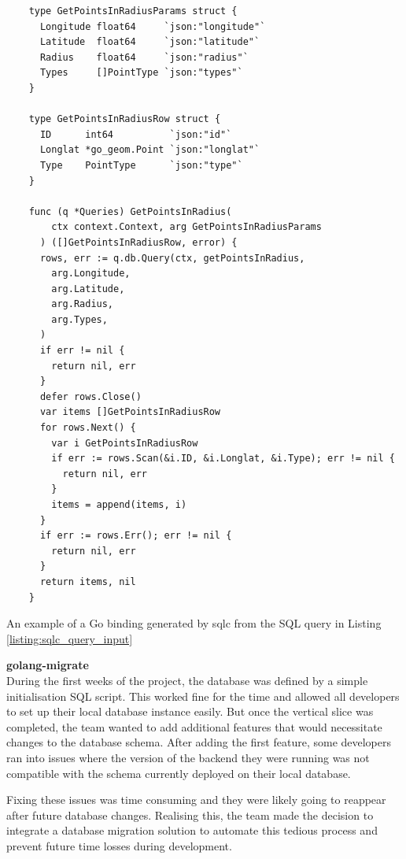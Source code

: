 \begin{listing}[htbp]
  \centering{}
  \begin{minipage}{0.85\textwidth}
  \begin{verbatim}
    type GetPointsInRadiusParams struct {
      Longitude float64     `json:"longitude"`
      Latitude  float64     `json:"latitude"`
      Radius    float64     `json:"radius"`
      Types     []PointType `json:"types"`
    }

    type GetPointsInRadiusRow struct {
      ID      int64          `json:"id"`
      Longlat *go_geom.Point `json:"longlat"`
      Type    PointType      `json:"type"`
    }

    func (q *Queries) GetPointsInRadius(
        ctx context.Context, arg GetPointsInRadiusParams
      ) ([]GetPointsInRadiusRow, error) {
      rows, err := q.db.Query(ctx, getPointsInRadius,
        arg.Longitude,
        arg.Latitude,
        arg.Radius,
        arg.Types,
      )
      if err != nil {
        return nil, err
      }
      defer rows.Close()
      var items []GetPointsInRadiusRow
      for rows.Next() {
        var i GetPointsInRadiusRow
        if err := rows.Scan(&i.ID, &i.Longlat, &i.Type); err != nil {
          return nil, err
        }
        items = append(items, i)
      }
      if err := rows.Err(); err != nil {
        return nil, err
      }
      return items, nil
    }
  \end{verbatim}
  \end{minipage}
  \caption{An example of a Go binding generated by sqlc from the SQL query in
  Listing \ref{listing:sqlc_query_input}}
  \label{listing:sqlc_generated_bindings}
\end{listing}

\newpage{}

\textbf{golang-migrate}\\
During the first weeks of the project, the database was defined by a simple
initialisation SQL script. This worked fine for the time and allowed all
developers to set up their local database instance easily. But once the vertical
slice was completed, the team wanted to add additional features that would
necessitate changes to the database schema. After adding the first feature, some
developers ran into issues where the version of the backend they were running
was not compatible with the schema currently deployed on their local database.

Fixing these issues was time consuming and they were likely going to reappear
after future database changes. Realising this, the team made the decision to
integrate a database migration solution to automate this tedious process and
prevent future time losses during development.

